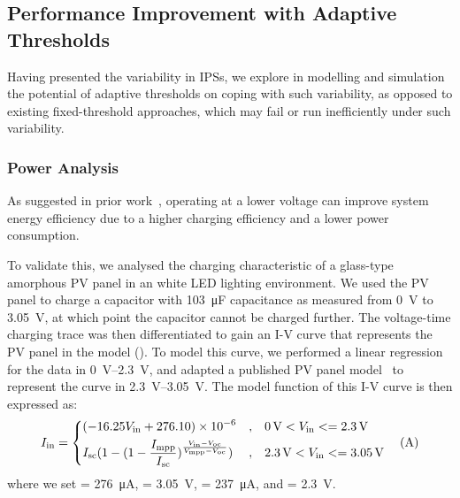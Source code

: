 \subsection{Performance Improvement with Adaptive Thresholds}

Having presented the variability in IPSs, we explore in modelling and simulation the potential of adaptive thresholds on coping with such variability, as opposed to existing fixed-threshold approaches, which may fail or run inefficiently under such variability.


\subsubsection{Power Analysis}

As suggested in prior work~\cite{gomez2016dynamic, pan2017maximize}, operating at a lower voltage can improve system energy efficiency due to a higher charging efficiency and a lower power consumption.

To validate this, we analysed the charging characteristic of a glass-type amorphous PV panel in an white LED lighting environment. 
We used the PV panel to charge a capacitor with \SI{103}{\micro\farad} capacitance as measured from \SI{0}{\volt} to \SI{3.05}{\volt}, at which point the capacitor cannot be charged further. 
The voltage-time charging trace was then differentiated to gain an I-V curve that represents the PV panel in the model (). 
To model this curve, we performed a linear regression for the data in \SIrange{0}{2.3}{\volt}, and adapted a published PV panel model~\cite{en9050326} to represent the curve in \SIrange{2.3}{3.05}{\volt}.
The model function of this I-V curve is then expressed as:
\begin{equation}
    I_{\text{in}} = \left\{
    \begin{aligned}
        & (-16.25 V_{\text{in}} + 276.10) \times 10^{-6}  & , & \quad \SI{0}{\volt} < V_{\text{in}} <= \SI{2.3}{\volt} \\
        & I_{\text{sc}} (1 - (1 - \frac{I_{\text{mpp}}}{I_{\text{sc}}})^{\frac{V_{\text{in}} - V_{\text{oc}}}{V_{\text{mpp}} - V_{\text{oc}}}}) & , & \quad \SI{2.3}{\volt} < V_{\text{in}} <= \SI{3.05}{\volt}
    \end{aligned}
    \right. 
    \quad (\SI{}{\ampere})
    \label{eq:pv_iv}
\end{equation}
where we set  = \SI{276}{\micro\ampere},  = \SI{3.05}{\volt},  = \SI{237}{\micro\ampere}, and  = \SI{2.3}{\volt}.

